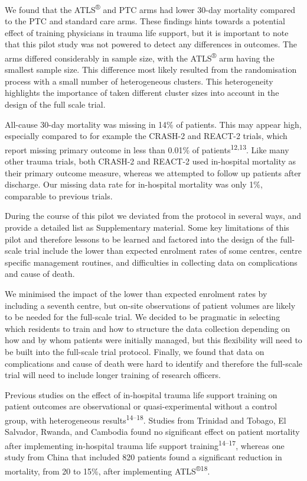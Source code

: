 \documentclass[
]{article}
\begin{document}
We found that the ATLS\textsuperscript{®} and PTC arms had lower 30-day mortality compared to the PTC and standard care arms. These findings hints towards a potential effect of training physicians in trauma life support, but it is important to note that this pilot study was not powered to detect any differences in outcomes. The arms differed considerably in sample size, with the ATLS\textsuperscript{®} arm having the smallest sample size. This difference most likely resulted from the randomisation process with a small number of heterogeneous clusters. This heterogeneity highlights the importance of taken different cluster sizes into account in the design of the full scale trial.

All-cause 30-day mortality was missing in 14\% of patients. This may appear high, especially compared to for example the CRASH-2 and REACT-2 trials, which report missing primary outcome in less than 0.01\% of patients\textsuperscript{12,13}. Like many other trauma trials, both CRASH-2 and REACT-2 used in-hospital mortality as their primary outcome measure, whereas we attempted to follow up patients after discharge. Our missing data rate for in-hospital mortality was only 1\%, comparable to previous trials.

During the course of this pilot we deviated from the protocol in several ways, and provide a detailed list as Supplementary
material. Some key limitations of this pilot and therefore lessons to be learned and factored into the design of the full-scale trial include the lower than expected enrolment rates of some centres, centre specific management routines, and difficulties in collecting data on complications and cause of death.

We minimised the impact of the lower than expected enrolment rates by including a seventh centre, but on-site observations of patient volumes are likely to be needed for the full-scale trial. We decided to be pragmatic in selecting which residents to train and how to structure the data collection depending on how and by whom patients were initially managed, but this flexibility will need to be built into the full-scale trial protocol. Finally, we found that data on complications and cause of death were hard to identify and therefore the full-scale trial will need to include longer training of research officers.

Previous studies on the effect of in-hospital trauma life support training on patient outcomes are observational or quasi-experimental without a control group, with heterogeneous results\textsuperscript{14--18}. Studies from Trinidad and Tobago, El Salvador, Rwanda, and Cambodia found no significant effect on patient mortality after implementing in-hospital trauma life support training\textsuperscript{14--17}, whereas one study from China that included 820 patients found a significant reduction in mortality, from 20 to 15\%, after implementing
ATLS\textsuperscript{®}\textsuperscript{18}.
\end{document}
